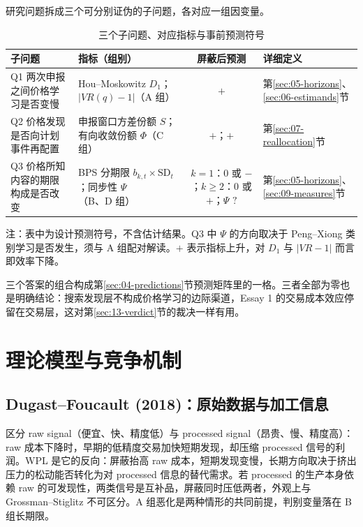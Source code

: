 \documentclass[a4paper,11pt]{ctexart}
\begin{document}
研究问题拆成三个可分别证伪的子问题，各对应一组因变量。

\begin{table}[htbp]
\centering
\caption{三个子问题、对应指标与事前预测符号}
\label{tab:03-subq}
\begin{threeparttable}
\begin{tabular}{@{}p{3.6cm}p{4.6cm}cp{3.4cm}@{}}
\toprule
子问题 & 指标（组别） & 屏蔽后预测 & 详细定义 \\
\midrule
Q1 两次申报之间价格学习是否变慢 & Hou--Moskowitz $D_1$；$|VR(q)-1|$（A 组） & $+$ & 第\ref{sec:05-horizons}、\ref{sec:06-estimands}节 \\
Q2 价格发现是否向计划事件再配置 & 申报窗口方差份额 $S$；有向收敛份额 $\Phi$（C 组） & $+$；$+$ & 第\ref{sec:07-reallocation}节 \\
Q3 价格所知内容的期限构成是否改变 & BPS 分期限 $b_{k,t}\times \mathrm{SD}_t$；同步性 $\Psi$（B、D 组） & $k=1$：$0$ 或 $-$；$k\ge 2$：$0$ 或 $+$；$\Psi$ $?$ & 第\ref{sec:05-horizons}、\ref{sec:09-measures}节 \\
\bottomrule
\end{tabular}
\begin{tablenotes}\footnotesize
\item 注：表中为设计预测符号，不含估计结果。Q3 中 $\Psi$ 的方向取决于 Peng--Xiong 类别学习是否发生，须与 A 组配对解读。$+$ 表示指标上升，对 $D_1$ 与 $|VR-1|$ 而言即效率下降。
\end{tablenotes}
\end{threeparttable}
\end{table}

三个答案的组合构成第\ref{sec:04-predictions}节预测矩阵里的一格。三者全部为零也是明确结论：搜索发现层不构成价格学习的边际渠道，Essay 1 的交易成本效应停留在交易层，这对第\ref{sec:13-verdict}节的裁决一样有用。
\clearpage

\section{理论模型与竞争机制}\label{sec:04-theory}

\subsection{Dugast--Foucault (2018)：原始数据与加工信息}\label{sec:04-df}

\citet{dugastfoucault2018} 区分 raw signal（便宜、快、精度低）与 processed signal（昂贵、慢、精度高）：raw 成本下降时，早期的低精度交易加快短期发现，却压缩 processed 信号的利润。WPL 是它的反向：屏蔽抬高 raw 成本，短期发现变慢，长期方向取决于挤出压力的松动能否转化为对 processed 信息的替代需求。若 processed 的生产本身依赖 raw 的可发现性，两类信号是互补品，屏蔽同时压低两者，外观上与 Grossman--Stiglitz 不可区分。A 组恶化是两种情形的共同前提，判别变量落在 B 组长期限。
\end{document}
